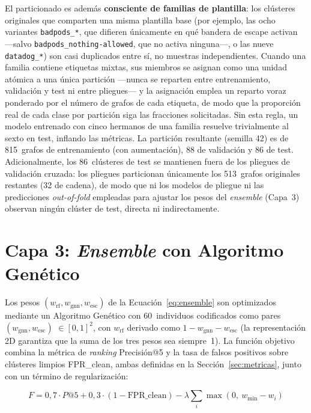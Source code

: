 El particionado es además \textbf{consciente de familias de plantilla}: los
clústeres originales que comparten una misma plantilla base (por ejemplo, las
ocho variantes \texttt{badpods\_*}, que difieren únicamente en qué bandera de
escape activan —salvo \texttt{badpods\_nothing-allowed}, que no activa ninguna\mbox{—,}
o las nueve \texttt{datadog\_*}) son casi duplicados entre sí, no
muestras independientes. Cuando una familia contiene etiquetas mixtas, sus
miembros se asignan como una unidad atómica a una única partición —nunca se
reparten entre entrenamiento, validación y test ni entre pliegues— y la
asignación emplea un reparto voraz ponderado por el número de grafos de cada
etiqueta, de modo que la proporción real de cada clase por partición siga las
fracciones solicitadas. Sin esta regla, un modelo entrenado con cinco hermanos de
una familia resuelve trivialmente al sexto en test, inflando las métricas. La
partición resultante (semilla 42) es de 815~grafos de entrenamiento (con
aumentación), 88 de validación y 86 de test. Adicionalmente, los 86~clústeres de
test se mantienen fuera de los pliegues de validación cruzada: los pliegues
particionan únicamente los 513~grafos originales restantes (32 de cadena), de
modo que ni los modelos de pliegue ni las predicciones \textit{out-of-fold}
empleadas para ajustar los pesos del \textit{ensemble} (Capa~3) observan ningún
clúster de test, directa ni indirectamente.

\section{Capa 3: \textit{Ensemble} con Algoritmo Genético}
\label{sec:capa3_diseno}

Los pesos \((w_{\text{rf}}, w_{\text{gnn}}, w_{\text{esc}})\) de la
Ecuación~\ref{eq:ensemble} son optimizados mediante un Algoritmo Genético
\citep{Holland1975} con 60~individuos codificados como pares
\((w_{\text{gnn}}, w_{\text{esc}})\) \(\in [0,1]^2\), con \(w_{\text{rf}}\) derivado
como \(1 - w_{\text{gnn}} - w_{\text{esc}}\) (la representación 2D garantiza que la
suma de los tres pesos sea siempre~1). La función objetivo combina la métrica de
\textit{ranking} Precisión@5 y la tasa de falsos positivos sobre clústeres
limpios \ac{FPR}\_clean, ambas definidas en la Sección~\ref{sec:metricas}, junto
con un término de regularización:

\begin{equation}
  F = 0{,}7 \cdot P@5 + 0{,}3 \cdot (1 - \text{FPR\_clean})
      - \lambda \sum_{i} \max(0,\ w_{\min} - w_i)
  \label{eq:ga_fitness}
\end{equation}

